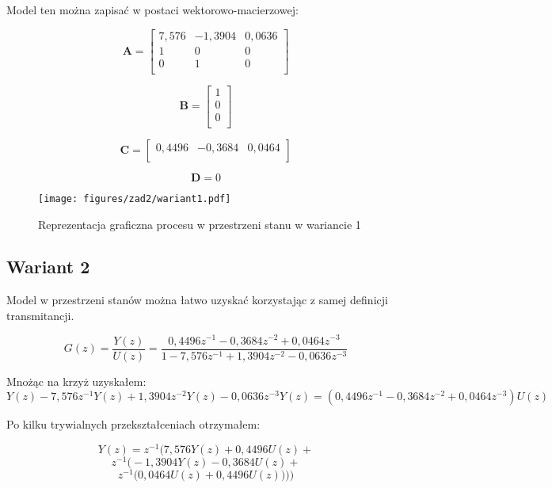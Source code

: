 \documentclass[a4paper,titlepage,11pt,floatssmall]{mwrep}
\begin{document}
Model ten można zapisać w postaci wektorowo-macierzowej:

$$
\mathbf{A} =
\left[ \begin{array}{ccc}
7,576 & -1,3904 & 0,0636 \\
1 & 0 & 0  \\
0 & 1 & 0  \\
\end{array} \right]
$$

$$
\mathbf{B} =
\left[\begin{array}{c}
1 \\
0 \\
0 \\
\end{array} \right]
$$

$$
\mathbf{C} =
\left[ \begin{array}{ccc}
0,4496 & -0,3684 & 0,0464\\
\end{array} \right]
$$

$$
\mathbf{D} = 0
$$

\newpage

\begin{figure}[H]
\centering
\texttt{[image: figures/zad2/wariant1.pdf]}
\caption{Reprezentacja graficzna procesu w przestrzeni stanu w wariancie 1}
\end{figure}

\newpage
\subsection{Wariant 2}
Model w przestrzeni stanów można łatwo uzyskać korzystając z samej definicji transmitancji. 

\begin{equation*}
G(z) = \frac{Y(z)}{U(z)} = \frac{0,4496z^{-1} - 0,3684z^{-2} + 0,0464z^{-3}}{1 - 7,576z^{-1} + 1,3904z^{-2} - 0,0636z^{-3}}
\end{equation*}

Mnożąc na krzyż uzyskałem:
\begin{equation*}
Y(z) - 7,576z^{-1}Y(z) + 1,3904z^{-2}Y(z) - 0,0636z^{-3}Y(z) = (0,4496z^{-1} - 0,3684z^{-2} + 0,0464z^{-3})U(z)
\end{equation*}

Po kilku trywialnych przekształceniach otrzymałem:

\begin{equation*}
Y(z) = z^{-1}\big(7,576Y(z) + 0,4496U(z) +
\end{equation*}
\begin{equation*}
z^{-1}\big(-1,3904Y(z) - 0,3684U(z) +
\end{equation*}
\begin{equation*}
z^{-1}\big( 0,0464U(z) + 0,4496U(z) \big) \big) \big)
\end{equation*}
\end{document}
